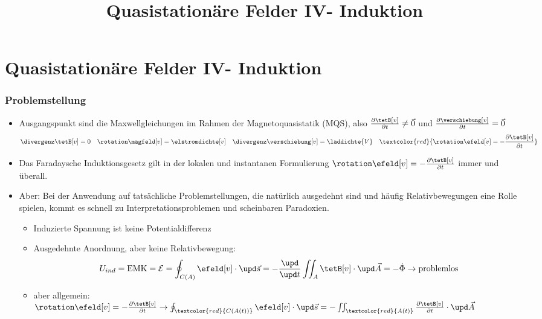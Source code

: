 
  
\title[TET: Quasistationäre Felder IV- Induktion]{Quasistationäre Felder IV- Induktion}


% 
% 

\maketitle

% 
% 
\section{Quasistationäre Felder IV- Induktion}

\begin{frame}
  \frametitle{Problemstellung}
  \begin{itemize}[<+->]
  \item Ausgangspunkt sind die Maxwellgleichungen im Rahmen der Magnetoquasistatik (MQS), also $\frac{\partial \tetB[v]}{\partial t}\ne \vec{0}$ und $\frac{\partial \verschiebung[v]}{\partial t} = \vec{0}$
    \begin{equation*}
      \divergenz \tetB[v] = 0  \quad \rotation \magfeld[v] = \elstromdichte[v] \quad 
      \divergenz \verschiebung[v] = \laddichte{V}  \quad \textcolor{red}{\rotation \efeld[v] = -\frac{\partial \tetB[v]}{\partial t}} 
    \end{equation*}
  \item Das \alert{Faradaysche Induktionsgesetz} gilt in der \alert{lokalen und instantanen} Formulierung $\rotation \efeld[v] = -\frac{\partial \tetB[v]}{\partial t}$ \alert{immer und überall}.
  \item \alert{Aber:} Bei der Anwendung auf tatsächliche Problemstellungen, die natürlich \alert{ausgedehnt} sind und häufig \alert{Relativbewegungen} eine Rolle spielen, kommt es schnell zu Interpretationsproblemen und \alert{scheinbaren Paradoxien}.
    \begin{itemize}[<+->]
    \item Induzierte Spannung ist \alert{keine Potentialdifferenz}
    \item Ausgedehnte Anordnung, aber \alert{keine Relativbewegung}:
      $$
      U_{ind} = \text{EMK} = \mathcal{E}=\oint_{C(A)} \efeld[v]\cdot\upd\vec{s} = - \frac{\upd }{\upd t} \iint_{A} \tetB[v] \cdot \upd \vec{A} = -\dot{\Phi} \to \text{problemlos}
      $$
      \item aber allgemein: $\rotation \efeld[v] = -\frac{\partial \tetB[v]}{\partial t} \to \oint_{\textcolor{red}{C(A(t))}} \efeld[v]\cdot\upd\vec{s} = -\iint_{\textcolor{red}{A(t)}} \frac{\partial \tetB[v]}{\partial t} \cdot \upd \vec{A}$
    \end{itemize}
  \end{itemize}
\end{frame}



